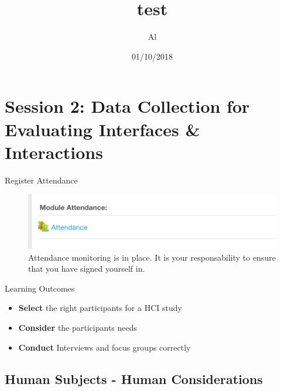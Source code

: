 \documentclass[ignorenonframetext,]{beamer}
\title{test}
\author{Al}
\date{01/10/2018}
\providecommand{\tightlist}{%
  \setlength{\itemsep}{0pt}\setlength{\parskip}{0pt}}
\begin{document}
\frame{\titlepage}

\section{Session 2: Data Collection for Evaluating Interfaces \&
Interactions}\label{session-2-data-collection-for-evaluating-interfaces-interactions}

\begin{frame}{Register Attendance}

\begin{figure}
\centering
\includegraphics{assets/attendance.png}
\caption{Attendance monitoring is in place. It is your responsability to
ensure that you have signed yourself in.}
\end{figure}

\end{frame}

\begin{frame}{Learning Outcomes}

\begin{itemize}
\tightlist
\item
  \textbf{Select} the right participants for a HCI study
\item
  \textbf{Consider} the participants needs
\item
  \textbf{Conduct} Interviews and focus groups correctly
\end{itemize}

\end{frame}

\subsection{Human Subjects - Human
Considerations}\label{human-subjects---human-considerations}
\end{document}
